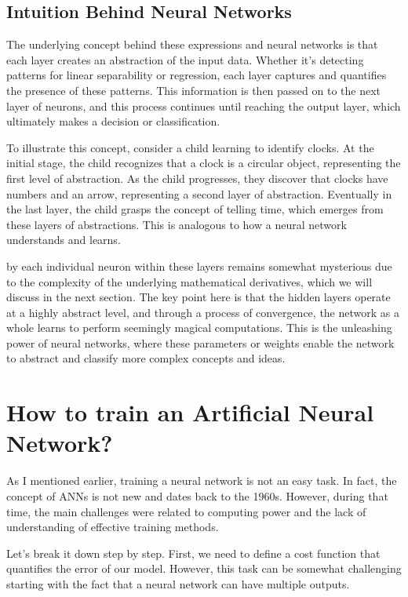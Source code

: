 \subsection{Intuition Behind Neural Networks}
The underlying concept behind these expressions and neural networks is that each layer creates an
abstraction of the input data. Whether it's detecting patterns for linear separability or regression,
each layer captures and quantifies the presence of these patterns. This information is then passed on
to the next layer of neurons, and this process continues until reaching the output layer, which ultimately
makes a decision or classification.

To illustrate this concept, consider a child learning to identify clocks. At the initial stage, the child
recognizes that a clock is a circular object, representing the first level of abstraction. As the child
progresses, they discover that clocks have numbers and an arrow, representing a second layer of abstraction.
Eventually in the last layer, the child grasps the concept of telling time, which emerges from these layers
of abstractions. This is analogous to how a neural network understands and learns.

by each individual neuron within these layers remains somewhat mysterious due to the complexity of the
underlying mathematical derivatives, which we will discuss in the next section. The key point here is that
the hidden layers operate at a highly abstract level, and through a process of convergence, the network as a
whole learns to perform seemingly magical computations. This is the unleashing power of neural networks,
where these parameters or weights enable the network to abstract and classify more complex concepts and ideas.

\section{How to train an Artificial Neural Network?}
As I mentioned earlier, training a neural network is not an easy task. In fact, the concept of
ANNs is not new and dates back to the 1960s. However, during that time, the main challenges were
related to computing power and the lack of understanding of effective training methods.

Let's break it down step by step. First, we need to define a cost function that quantifies the error of
our model.
However, this task can be somewhat challenging starting with
the fact that a neural network can have multiple outputs.

